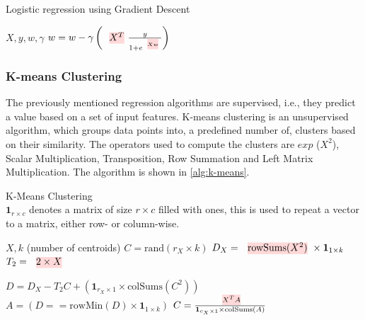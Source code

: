 \begin{algorithm}[ht]
    \caption[Linear regression]{Logistic regression using Gradient Descent
        \cite{morpheus}}\label{alg:logistic-regression}
    \begin{algorithmic}
        \Require $X, y , w, \gamma$
        \State $w = w - \gamma \left(\text{\red{$X^T$}} \frac{y}{1+e^{\text{\red{$X w$}}}}\right)$
        \EndFor
    \end{algorithmic}
\end{algorithm}

\subsubsection{K-means Clustering}
The previously mentioned regression algorithms are supervised, i.e., they predict a value based on a set of input features. K-means clustering is an unsupervised algorithm, which groups data points into, a predefined number of, clusters based on their similarity. The operators used to compute the clusters are $exp$ ($X^2$), Scalar Multiplication, Transposition, Row Summation and Left Matrix Multiplication. The algorithm is shown in \autoref{alg:k-means}.

\begin{algorithm}[ht]
    \caption[K-Means Clustering]{K-Means Clustering
        \cite{morpheus}\\
        $\mathbf{1}_{r \times c}$ denotes a matrix of size $r \times c$ filled with ones, this is used to repeat a vector to a matrix, either row- or column-wise.}\label{alg:k-means}
    \begin{algorithmic}
        \Require $X, k$ (number of centroids)
        \State $C = \text{rand}(r_X \times k)$ 
        \State $D_X = \text{\red{rowSums($X^2$)}} \times \mathbf{1}_{1 \times k}$ 
        \State $T_2 = \text{\red{$2 \times X$}}$

        \State $D = D_X - T_2C + \left( \mathbf{1}_{r_X\times 1} \times \text{colSums}(C^2) \right)$ 
        \State $A = (D == \text{rowMin}(D) \times \mathbf{1}_{1 \times k})$ 
        \State $C =\frac{\text{\red{$X^T A$}}}{\mathbf{1}_{c_X \times 1} \times \text{colSums}(A)}$ 
        \EndFor
    \end{algorithmic}
\end{algorithm}

